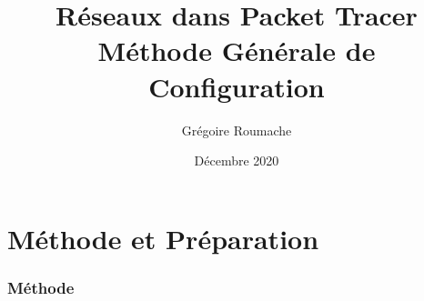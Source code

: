 \documentclass[a4paper]{article}
\title{Réseaux dans Packet Tracer \\ Méthode Générale de Configuration}
\author{Grégoire Roumache}
\date{Décembre 2020}
\begin{document}
\maketitle















\part{Méthode et Préparation}










\section{Méthode}
\end{document}
